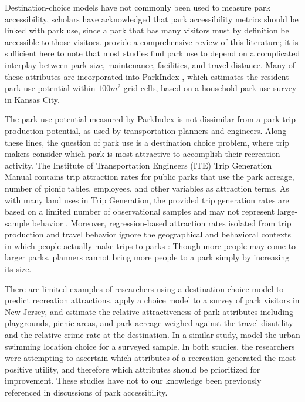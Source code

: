 \documentclass[3p, authoryear]{elsarticle} %
\begin{document}
Destination-choice models have not commonly been used to measure park
accessibility, scholars have acknowledged that park accessibility metrics should
be linked with park use, since a park that has many visitors must by definition
be accessible to those visitors. \citet{McCormack2010} provide a comprehensive review
of this literature; it is sufficient here to note that most studies find park
use to depend on a complicated interplay between park size, maintenance,
facilities, and travel distance. Many of these attributes are incorporated into
ParkIndex \citep{Kaczynski2016}, which estimates the resident park use potential
within \(100 m^2\) grid cells, based on a household park use survey in Kansas
City.

The park use potential measured by ParkIndex is not dissimilar from a park trip
production potential, as used by transportation planners and engineers. Along
these lines, the question of park use is a destination choice problem, where
trip makers consider which park is most attractive to accomplish their
recreation activity. The Institute of Transportation Engineers (ITE) Trip
Generation Manual \citeyearpar{ite2019} contains trip attraction rates for public parks
that use the park acreage, number of picnic tables, employees, and other
variables as attraction terms. As with many land uses in Trip Generation, the
provided trip generation rates are based on a limited number of observational
samples \citep{shoup_truth_2003} and may not represent large-sample behavior
\citep{Millard-Ball2015}. Moreover, regression-based attraction rates isolated from
trip production and travel behavior ignore the geographical and behavioral
contexts in which people actually make trips to parks \citep{Barnard1987}: Though
more people may come to larger parks, planners cannot bring more people to a
park simply by increasing its size.

There are limited examples of researchers using a destination choice model to
predict recreation attractions. \citet{Kinnell2006} apply a choice model to a survey of
park visitors in New Jersey, and estimate the relative attractiveness of park
attributes including playgrounds, picnic areas, and park acreage weighed against
the travel disutility and the relative crime rate at the destination. In a
similar study, \citet{Meyerhoff2010} model the urban swimming location choice for a
surveyed sample. In both studies, the researchers were attempting to ascertain
which attributes of a recreation generated the most positive utility, and
therefore which attributes should be prioritized for improvement. These studies
have not to our knowledge been previously referenced in discussions of park
accessibility.
\end{document}
